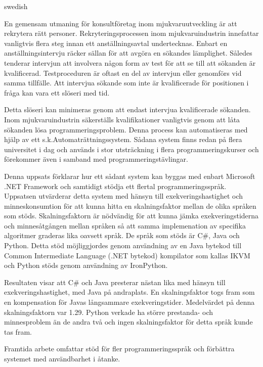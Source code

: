 \begin{foreignabstract}{swedish}

En gemensam utmaning för konsultföretag inom mjukvaruutveckling är att rekrytera rätt personer. Rekryteringsprocessen inom mjukvaruindustrin innefattar vanligtvis flera steg innan ett anställningsavtal undertecknas. Enbart en anställningsintervju räcker sällan för att avgöra en sökandes lämplighet. Således tenderar intervjun att involvera någon form av test för att se till att sökanden är kvalificerad. Testproceduren är oftast en del av intervjun eller genomförs vid samma tillfälle. Att intervjua sökande som inte är kvalificerade för positionen i fråga kan vara ett slöseri med tid.

Detta slöseri kan minimeras genom att endast intervjua kvalificerade sökanden. Inom mjukvaruindustrin säkerställs kvalifikationer vanligtvis genom att låta sökanden lösa programmeringsproblem. Denna process kan automatiseras med hjälp av ett s.k.Automaträttningssystem. Sådana system finns redan på flera universitet i dag och används i stor utsträckning i flera programmeringskurser och förekommer även i samband med programmeringstävlingar.

Denna uppsats förklarar hur ett sådant system kan byggas med enbart Microsoft .NET Framework och samtidigt stödja ett flertal programmeringsspråk. Uppsatsen utvärderar detta system med hänsyn till exekveringshastighet och minneskonsumtion för att kunna hitta en skalningsfaktor mellan de olika språken som stöds. Skalningsfaktorn är nödvändig för att kunna jämka exekveringstiderna och minnesåtgången mellan språken så att samma implemenation av specifika algoritmer graderas lika oavsett språk. De språk som stöds är C\#, Java och Python. Detta stöd möjliggjordes genom användning av en Java bytekod till Common Intermediate Language (.NET bytekod) kompilator som kallas IKVM och Python stöds genom användning av IronPython.

Resultaten visar att C\# och Java presterar nästan lika med hänsyn till exekveringshastighet, med Java på andraplats. En skalningsfaktor togs fram som en kompensation för Javas långsammare exekveringstider. Medelvärdet på denna skalningsfaktorn var 1.29. Python verkade ha större prestanda- och minnesproblem än de andra två och ingen skalningsfaktor för detta språk kunde tas fram.

Framtida arbete omfattar stöd för fler programmeringsspråk och förbättra systemet med användbarhet i åtanke.

\end{foreignabstract}
